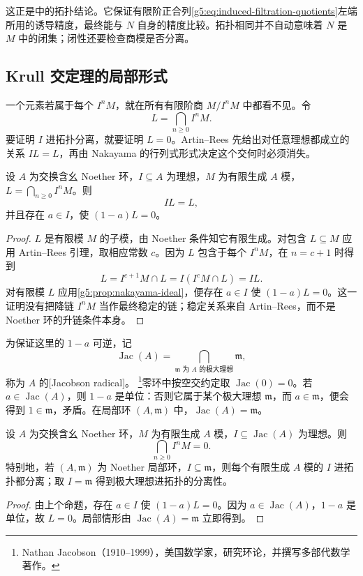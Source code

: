这正是\cite[第8节，定理8.6，第59—60页]{Matsumura1989}中的拓扑结论。它保证有限阶正合列\eqref{g5:eq:induced-filtration-quotients}左端所用的诱导精度，最终能与 \(N\) 自身的精度比较。拓扑相同并不自动意味着 \(N\) 是 \(M\) 中的闭集；闭性还要检查商模是否分离。

\subsection{Krull 交定理的局部形式}
\label{g5:subsec:0702:04}

一个元素若属于每个 \(I^nM\)，就在所有有限阶商 \(M/I^nM\) 中都看不见。令
\[
	L=\bigcap_{n\geq0}I^nM.
\]
要证明 \(I\) 进拓扑分离，就要证明 \(L=0\)。Artin–Rees 先给出对任意理想都成立的关系 \(IL=L\)，再由 Nakayama 的行列式形式决定这个交何时必须消失。

\begin{proposition}\label{g5:prop:krull-intersection-annihilator}
	设 \(A\) 为交换含幺 Noether 环，\(I\subseteq A\) 为理想，\(M\) 为有限生成 \(A\) 模，\(L=\bigcap_{n\geq0}I^nM\)。则
	\[
		IL=L,
	\]
	并且存在 \(a\in I\)，使 \((1-a)L=0\)。
\end{proposition}
\begin{proof}
	\(L\) 是有限模 \(M\) 的子模，由 Noether 条件知它有限生成。对包含 \(L\subseteq M\) 应用 Artin–Rees 引理，取相应常数 \(c\)。因为 \(L\) 包含于每个 \(I^nM\)，在 \(n=c+1\) 时得到
	\[
		L=I^{c+1}M\cap L
		=I(I^cM\cap L)=IL.
	\]
	对有限模 \(L\) 应用\cref{g5:prop:nakayama-ideal}，便存在 \(a\in I\) 使 \((1-a)L=0\)。这一证明没有把降链 \(I^nM\) 当作最终稳定的链；稳定关系来自 Artin–Rees，而不是 Noether 环的升链条件本身。
\end{proof}

为保证这里的 \(1-a\) 可逆，记
\[
	\operatorname{Jac}(A)=
	\bigcap_{\mathfrak m\text{ 为 }A\text{ 的极大理想}}\mathfrak m,
\]
称为 \(A\) 的[Jacobson radical]。
\footnote{Nathan Jacobson（1910--1999），美国数学家，研究环论，并撰写多部代数学著作。}零环中按空交约定取 \(\operatorname{Jac}(0)=0\)。若 \(a\in\operatorname{Jac}(A)\)，则 \(1-a\) 是单位：否则它属于某个极大理想 \(\mathfrak m\)，而 \(a\in\mathfrak m\)，便会得到 \(1\in\mathfrak m\)，矛盾。在局部环 \((A,\mathfrak m)\) 中，\(\operatorname{Jac}(A)=\mathfrak m\)。

\begin{theorem}\label{g5:thm:krull-intersection}
	设 \(A\) 为交换含幺 Noether 环，\(M\) 为有限生成 \(A\) 模，\(I\subseteq\operatorname{Jac}(A)\) 为理想。则
	\[
		\bigcap_{n\geq0}I^nM=0.
	\]
	特别地，若 \((A,\mathfrak m)\) 为 Noether 局部环，\(I\subseteq\mathfrak m\)，则每个有限生成 \(A\) 模的 \(I\) 进拓扑都分离；取 \(I=\mathfrak m\) 得到极大理想进拓扑的分离性。
\end{theorem}
\begin{proof}
	由上个命题，存在 \(a\in I\) 使 \((1-a)L=0\)。因为 \(a\in\operatorname{Jac}(A)\)，\(1-a\) 是单位，故 \(L=0\)。局部情形由 \(\operatorname{Jac}(A)=\mathfrak m\) 立即得到。
\end{proof}

